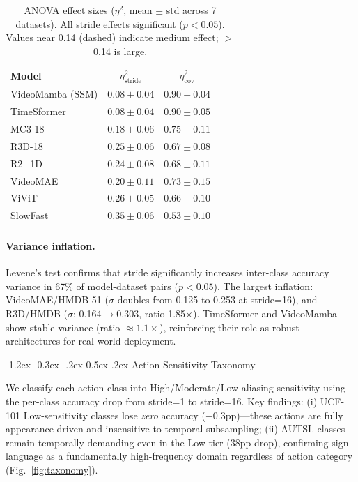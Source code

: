 \documentclass[runningheads]{llncs}
\makeatletter
\renewcommand\subsection{\@startsection{subsection}{2}{\z@}%
                       {-1.2ex \@plus -0.3ex \@minus -.2ex}%
                       {0.5ex \@plus .2ex}%
                       {\normalfont\normalsize\bfseries\boldmath}}
\newcommand{\tabtight}{\setlength{\tabcolsep}{3.5pt}\renewcommand{\arraystretch}{1.12}}
\makeatother
\begin{document}
\begin{table}[t]
\centering
\caption{ANOVA effect sizes ($\eta^2$, mean $\pm$ std across 7 datasets).
  All stride effects significant ($p{<}0.05$). Values near 0.14 (dashed) indicate
  medium effect; $>$0.14 is large.}
\label{tab:anova}
\scriptsize\tabtight
\begin{tabular}{l cc cc}
\toprule
Model & $\eta^2_\text{stride}$ & $\eta^2_\text{cov}$ \\
\midrule
VideoMamba (SSM)   & $0.08 \pm 0.04$ & $0.90 \pm 0.04$ \\
TimeSformer        & $0.08 \pm 0.04$ & $0.90 \pm 0.05$ \\
MC3-18             & $0.18 \pm 0.06$ & $0.75 \pm 0.11$ \\
R3D-18             & $0.25 \pm 0.06$ & $0.67 \pm 0.08$ \\
R2+1D              & $0.24 \pm 0.08$ & $0.68 \pm 0.11$ \\
VideoMAE           & $0.20 \pm 0.11$ & $0.73 \pm 0.15$ \\
ViViT              & $0.26 \pm 0.05$ & $0.66 \pm 0.10$ \\
SlowFast           & $0.35 \pm 0.06$ & $0.53 \pm 0.10$ \\
\bottomrule
\end{tabular}
\end{table}

\paragraph{Variance inflation.}
Levene's test confirms that stride significantly increases inter-class accuracy
variance in 67\% of model-dataset pairs ($p < 0.05$).
The largest inflation: VideoMAE/HMDB-51 ($\sigma$ doubles from 0.125 to 0.253
at stride=16), and R3D/HMDB ($\sigma$: 0.164$\to$0.303, ratio 1.85$\times$).
TimeSformer and VideoMamba show stable variance (ratio $\approx 1.1\times$),
reinforcing their role as robust architectures for real-world deployment.

\subsection{Action Sensitivity Taxonomy}

We classify each action class into High/Moderate/Low aliasing sensitivity using
the per-class accuracy drop from stride=1 to stride=16.
Key findings:
(i) UCF-101 Low-sensitivity classes lose \emph{zero} accuracy ($-0.3$pp)—these
actions are fully appearance-driven and insensitive to temporal subsampling;
(ii) AUTSL classes remain temporally demanding even in the Low tier (38pp drop),
confirming sign language as a fundamentally high-frequency domain regardless of
action category (Fig.~\ref{fig:taxonomy}).
\end{document}
